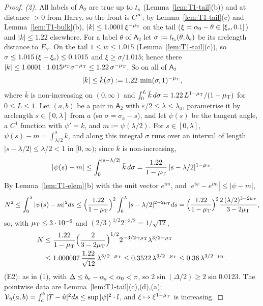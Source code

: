 \begin{proof}
\emph{(2).} All labels of $\mathsf A_2$ are true up to $t_{\mathrm s}$ (Lemma~\ref{lem:T1-tail}(b)) and at distance $>0$ from Harry, so the front
is $C^\infty$; by Lemma~\ref{lem:T1-tail}(c) and Lemma~\ref{lem:T1-bulk}(b), $|k|\le1.0001\,\xi^{-\mu_{\mathrm T}}$ on the tail
($\xi=\alpha_0-\theta\in[\xi_{\mathrm e},0.1]$) and $|k|\le1.22$ elsewhere. For a label $\theta$ of $\mathsf A_2$ let
$\sigma:=l_{t_{\mathrm s}}(\theta,b_{\mathrm e})$ be its arclength distance to $E_Y$. On the tail $1\le w\le1.015$ (Lemma~\ref{lem:T1-tail}(c)), so
$\sigma\le1.015\,(\xi-\xi_{\mathrm e})\le0.1015$ and $\xi\ge\sigma/1.015$; hence there $|k|\le1.0001\cdot1.015^{\mu_{\mathrm T}}\sigma^{-\mu_{\mathrm T}}\le1.22\,\sigma^{-\mu_{\mathrm T}}$.
So on all of $\mathsf A_2$
\[
|k|\le\bar k(\sigma):=1.22\,\min(\sigma,1)^{-\mu_{\mathrm T}},
\]
where $\bar k$ is non-increasing on $(0,\infty)$ and $\int_0^L\bar k\,d\sigma=1.22\,L^{1-\mu_{\mathrm T}}/(1-\mu_{\mathrm T})$ for $0\le L\le1$. Let $(a,b)$ be a
pair in $\mathsf A_2$ with $\varepsilon/2\le\lambda\le\lambda_0$, parametrise it by arclength $s\in[0,\lambda]$ from $a$ (so
$\sigma=\sigma_a-s$), and let $\psi(s)$ be the tangent angle, a $C^1$ function with $\psi'=k$, and $m:=\psi(\lambda/2)$. For
$s\in[0,\lambda]$, $\psi(s)-m=\int_{\lambda/2}^sk$, and along this integral $\sigma$ runs over an interval of length
$|s-\lambda/2|\le\lambda/2<1$ in $[0,\infty)$; since $\bar k$ is non-increasing,
\[
|\psi(s)-m|\le\int_0^{|s-\lambda/2|}\bar k\,d\sigma=\frac{1.22}{1-\mu_{\mathrm T}}\,|s-\lambda/2|^{1-\mu_{\mathrm T}}.
\]
By Lemma~\ref{lem:T1-elem}(b) with the unit vector $e^{im}$, and $|e^{i\psi}-e^{im}|\le|\psi-m|$,
\[
N^2\le\int_0^\lambda|\psi(s)-m|^2ds\le\Bigl(\frac{1.22}{1-\mu_{\mathrm T}}\Bigr)^2\int_0^\lambda|s-\lambda/2|^{2-2\mu_{\mathrm T}}ds
=\Bigl(\frac{1.22}{1-\mu_{\mathrm T}}\Bigr)^2\frac{2\,(\lambda/2)^{3-2\mu_{\mathrm T}}}{3-2\mu_{\mathrm T}},
\]
so, with $\mu_{\mathrm T}\le3\cdot10^{-6}$ and $(2/3)^{1/2}2^{-3/2}=1/\sqrt{12}$,
\begin{align*}
N&\le\frac{1.22}{1-\mu_{\mathrm T}}\Bigl(\frac2{3-2\mu_{\mathrm T}}\Bigr)^{1/2}2^{-3/2+\mu_{\mathrm T}}\lambda^{3/2-\mu_{\mathrm T}}\\
&\le1.000007\,\frac{1.22}{\sqrt{12}}\,\lambda^{3/2-\mu_{\mathrm T}}\le0.3522\,\lambda^{3/2-\mu_{\mathrm T}}\le0.36\,\lambda^{3/2-\mu_{\mathrm T}}.
\end{align*}
\textup{(E2)}: as in (1), with $\Delta\le b_{\mathrm e}-\alpha_{\mathrm s}<\alpha_0<\pi$, so $2\sin(\Delta/2)\ge2\sin0.0123$. The pointwise data are
Lemma~\ref{lem:T1-tail}(c),(d),(a); $\mathcal V_{\hat u}(a,b)=\int_a^b|T-\hat u|^2ds\le\sup|\psi|^2\cdot l$, and $\xi\mapsto\xi^{1-\mu_{\mathrm T}}$ is
increasing.
\end{proof}

